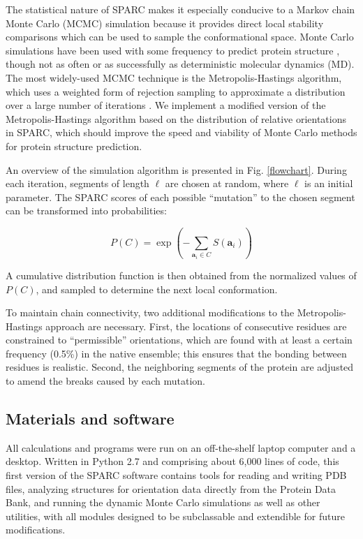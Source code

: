 \documentclass[11pt,titlepage]{article}
\begin{document}
The statistical nature of SPARC makes it especially conducive to a Markov chain Monte Carlo (MCMC) simulation because it provides direct local stability comparisons which can be used to sample the conformational space.
Monte Carlo simulations have been used with some frequency to predict protein structure \cite{kolinski,enciso}, though not as often or as successfully as deterministic molecular dynamics (MD).
The most widely-used MCMC technique is the Metropolis-Hastings algorithm, which uses a weighted form of rejection sampling to approximate a distribution over a large number of iterations \cite{metropolis}.
We implement a modified version of the Metropolis-Hastings algorithm based on the distribution of relative orientations in SPARC, which should improve the speed and viability of Monte Carlo methods for protein structure prediction.

An overview of the simulation algorithm is presented in Fig. \ref{flowchart}.
During each iteration, segments of length $\ell$ are chosen at random, where $\ell$ is an initial parameter.
The SPARC scores of each possible ``mutation'' to the chosen segment can be transformed into probabilities:

\begin{equation}
P(C) = \exp{\left(-\sum_{\textbf{a}_i\in C}S(\textbf{a}_i)\right)}
\label{probability_eq}
\end{equation}

A cumulative distribution function is then obtained from the normalized values of $P(C)$, and sampled to determine the next local conformation.

To maintain chain connectivity, two additional modifications to the Metropolis-Hastings approach are necessary. 
First, the locations of consecutive residues are constrained to ``permissible'' orientations, which are found with at least a certain frequency (0.5\%) in the native ensemble; this ensures that the bonding between residues is realistic.
Second, the neighboring segments of the protein are adjusted to amend the breaks caused by each mutation.

\subsection{Materials and software}
\label{materials}
All calculations and programs were run on an off-the-shelf laptop computer and a desktop.
Written in Python 2.7 and comprising about 6,000 lines of code, this first version of the SPARC software contains tools for reading and writing PDB files, analyzing structures for orientation data directly from the Protein Data Bank, and running the dynamic Monte Carlo simulations as well as other utilities, with all modules designed to be subclassable and extendible for future modifications.
\end{document}
